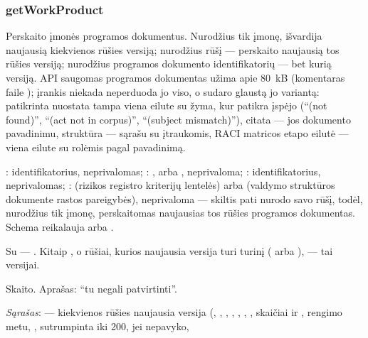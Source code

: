 \subsubsection{getWorkProduct}\label{sec:tools:getWorkProduct}
\begin{description}[style=multiline, leftmargin=19mm, labelwidth=17mm, labelsep=2mm,
  font=\sffamily\bfseries\footnotesize\color{ink}, itemsep=1pt, topsep=2pt, before=\raggedright]
  \item[Paskirtis] Perskaito įmonės programos dokumentus. Nurodžius tik įmonę, išvardija
    naujausią kiekvienos rūšies versiją; nurodžius rūšį --- perskaito naujausią tos rūšies
    versiją; nurodžius programos dokumento identifikatorių --- bet kurią versiją. API saugomas
    programos dokumentas užima apie 80~kB (komentaras faile );
    įrankis niekada neperduoda jo viso, o sudaro glaustą jo variantą: patikrinta nuostata tampa viena eilute
    su žyma, kur patikra įspėjo (\enquote{(not found)}, \enquote{(act not in corpus)},
    \enquote{(subject mismatch)}), citata --- jos dokumento pavadinimu, struktūra --- sąrašu su
    įtraukomis, RACI matricos etapo eilutė --- viena eilute su rolėmis pagal pavadinimą.
  \item[Įvestis] : identifikatorius, neprivalomas; : ,
     arba , neprivaloma; : identifikatorius,
    neprivalomas; :  (rizikos registro kriterijų lentelės) arba
     (valdymo struktūros dokumente rastos pareigybės), neprivaloma --- skiltis
    pati nurodo savo rūšį, todėl, nurodžius tik įmonę, perskaitomas naujausias tos rūšies
    programos dokumentas. Schema
    reikalauja  arba .
  \item[Užklausos] Su  --- . Kitaip
    , o rūšiai, kurios naujausia versija turi turinį
    ( arba ), ---  tai versijai.
  \item[Pobūdis] Skaito. Aprašas: \enquote{tu negali patvirtinti}.
  \item[Grąžina] \emph{Sąrašas}:  --- kiekvienos rūšies naujausia versija
    (, , , , ,
    , , skaičiai  ir ,
     rengimo metu, , sutrumpinta iki 200, jei nepavyko, 

\end{description}

